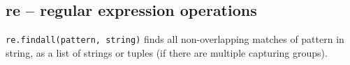 %

\subsection{re -- regular expression operations}

\texttt{re.findall(pattern, string)} finds all non-overlapping matches of pattern in string, as a list of strings or tuples (if there are multiple capturing groups).

%
